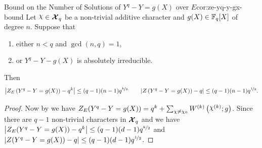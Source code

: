 \begin{corolary}{Bound on the Number of Solutions of $Y^q-Y=g(X)$ over $E$}{cor:ze-yq-y-gx-bound}
  Let $\chi\in\Xq$ be a non-trivial additive character and $g(X)\in\mathbb{F}_q[X]$ of degree $n$. Suppose that
  \begin{enumerate}[label=(\roman*)]
    \item either $n<q$ and $\gcd(n,q)=1$,
    \item or $Y^q-Y-g(X)$ is absolutely irreducible.
  \end{enumerate}
  Then $$\left|Z_E\left(Y^q-Y=g(X)\right)-q^k\right|\leq (q-1)(n-1)q^{\nicefrac{k}2}\qquad \left|Z\left(Y^q-Y=g(X)\right)-q\right|\leq (q-1)(n-1)q^{\nicefrac{1}2}.$$
\end{corolary}
\begin{proof}
  Now by \WeilRootsModulusChilem we have $Z_E(Y^q-Y=g(X))=q^k+\sum_{\oldchi\neq \oldchi_0}\Wchil{k}{g}$. Since there are $q-1$ non-trivial characters in $\boldsymbol{\mathcal{X}}_q$ and \WeilBoundChithm we have $\left|Z_E(Y^q-Y=g(X))-q^k\right|\leq (q-1)(d-1)q^{\nicefrac{k}2}$ and $\left|Z(Y^q-Y=g(X))-q\right|\leq (q-1)(d-1)q^{\nicefrac12}$. 
\end{proof}
